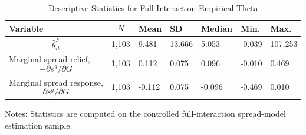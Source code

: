 \begin{table}[H]\centering
\begin{threeparttable}
\caption{Descriptive Statistics for Full-Interaction Empirical Theta}
\label{tab:theta_descriptive_stats}
\scriptsize
\begin{tabularx}{\textwidth}{lYYYYYY}
\toprule
Variable & $$N$$ & Mean & SD & Median & Min. & Max. \\
\midrule
$$\widehat{\theta}^{F}_{it}$$ & 1,103 & 9.481 & 13.666 & 5.053 & -0.039 & 107.253 \\
Marginal spread relief, $$-\partial s^g/\partial G$$ & 1,103 & 0.112 & 0.075 & 0.096 & -0.010 & 0.469 \\
Marginal spread response, $$\partial s^g/\partial G$$ & 1,103 & -0.112 & 0.075 & -0.096 & -0.469 & 0.010 \\
\bottomrule
\end{tabularx}
\begin{tablenotes}[flushleft]\footnotesize
\item Notes: Statistics are computed on the controlled full-interaction spread-model estimation sample.
\end{tablenotes}
\end{threeparttable}
\end{table}
